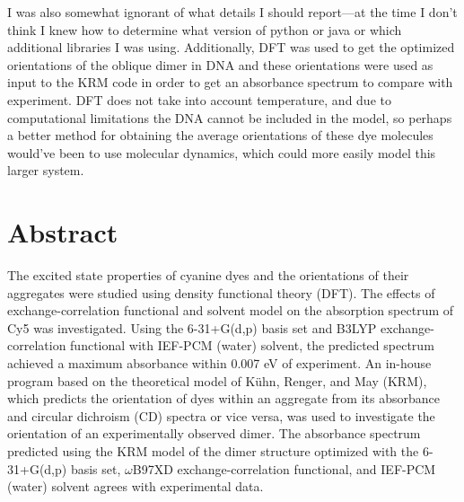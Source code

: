 I was also somewhat ignorant of what details I should report---at the time I don't think I knew how to determine what version of python or java or which additional libraries I was using.
Additionally, DFT was used to get the optimized orientations of the oblique dimer in DNA and these orientations were used as input to the KRM code in order to get an absorbance spectrum to compare with experiment. 
DFT does not take into account temperature, and due to computational limitations the DNA cannot be included in the model, so perhaps a better method for obtaining the average orientations of these dye molecules would've been to use molecular dynamics, which could more easily model this larger system.

\section{Abstract}

The excited state properties of cyanine dyes and the orientations of their aggregates were studied using density functional theory (DFT). The effects of exchange-correlation functional and solvent model on the absorption spectrum of Cy5 was investigated. Using the 6-31+G(d,p) basis set and B3LYP exchange-correlation functional with IEF-PCM (water) solvent, the predicted spectrum achieved a maximum absorbance within 0.007 eV of experiment. An in-house program based on the theoretical model of Kühn, Renger, and May (KRM), which predicts the orientation of dyes within an aggregate from its absorbance and circular dichroism (CD) spectra or vice versa, was used to investigate the orientation of an experimentally observed dimer. The absorbance spectrum predicted using the KRM model of the dimer structure optimized with the 6-31+G(d,p) basis set, $\omega$B97XD exchange-correlation functional, and IEF-PCM (water) solvent agrees with experimental data. 

